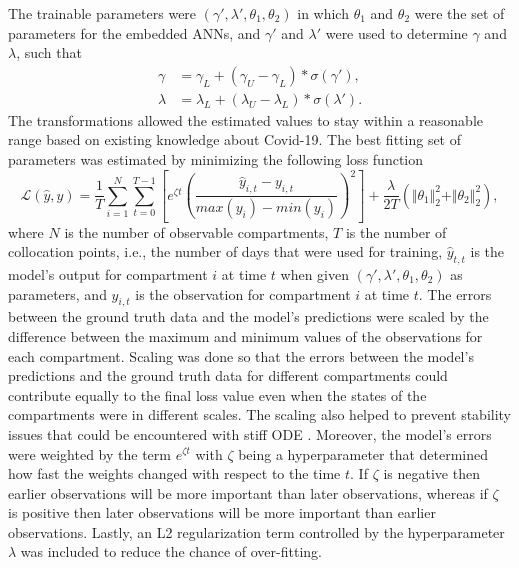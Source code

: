 The trainable parameters were $(\gamma', \lambda', \theta_1, \theta_2)$ in which $\theta_1$ and $\theta_2$ were the set of parameters for the embedded \glspl{ANN}, and $\gamma'$ and $\lambda'$ were used to determine $\gamma$ and $\lambda$, such that
\begin{equation}
    \begin{aligned}
        \gamma &= \gamma_L + (\gamma_U - \gamma_L) * \sigma (\gamma'), \\
        \lambda &= \lambda_L + (\lambda_U - \lambda_L) * \sigma (\lambda').
    \end{aligned}
\end{equation}
The transformations allowed the estimated values to stay within a reasonable range based on existing knowledge about Covid-19.
The best fitting set of parameters was estimated by minimizing the following loss function
\begin{equation}
    \mathcal{L}(\hat{y}, y) = \frac{1}{T} \sum_{i=1}^N \sum_{t=0}^{T-1} \left[ e^{\zeta t} \left(\frac{\hat{y}_{i,t} - y_{i,t}}{max(y_i) - min(y_i)}\right)^2\right] + \frac{\lambda}{2T} (\Vert\theta_1\Vert^2_2 + \Vert\theta_2\Vert^2_2),
    \label{eq:ude-model-loss}
\end{equation}
where $N$ is the number of observable compartments, $T$ is the number of collocation points, i.e., the number of days that were used for training, $\hat{y}_{t,t}$ is the model's output for compartment $i$ at time $t$ when given $(\gamma', \lambda', \theta_1, \theta_2)$ as parameters, and $y_{i,t}$ is the observation for compartment $i$ at time $t$.
The errors between the ground truth data and the model's predictions were scaled by the difference between the maximum and minimum values of the observations for each compartment.
Scaling was done so that the errors between the model's predictions and the ground truth data for different compartments could contribute equally to the final loss value even when the states of the compartments were in different scales.
The scaling also helped to prevent stability issues that could be encountered with stiff \gls{ODE} \cite{kimStiffNeuralOrdinary2021}.
Moreover, the model's errors were weighted by the term $e^{\zeta t}$ with $\zeta$ being a hyperparameter that determined how fast the weights changed with respect to the time $t$.
If $\zeta$ is negative then earlier observations will be more important than later observations, whereas if $\zeta$ is positive then later observations will be more important than earlier observations.
Lastly, an L2 regularization term controlled by the hyperparameter $\lambda$ was included to reduce the chance of over-fitting.

